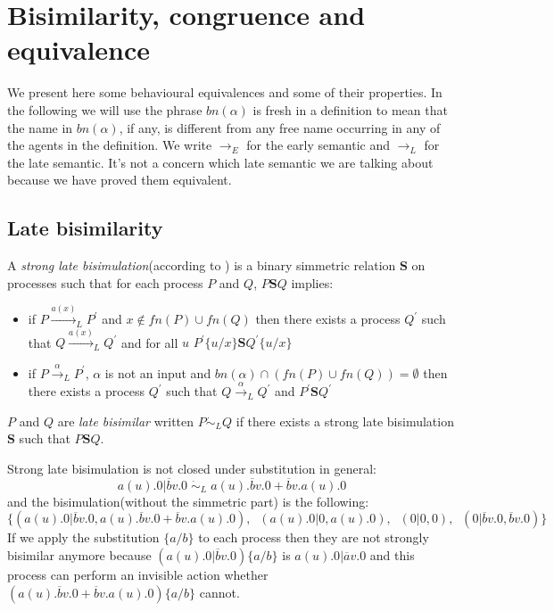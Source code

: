 \section{Bisimilarity, congruence and equivalence}

We present here some behavioural equivalences and some of their properties. In the following we will use the phrase $bn(\alpha)$ is fresh in a definition to mean that the name in $bn(\alpha)$, if any, is different from any free name occurring in any of the agents in the definition. We write $\rightarrow_{E}$ for the early semantic and $\rightarrow_{L}$ for the late semantic. It's not a concern which late semantic we are talking about because we have proved them equivalent.


\subsection{Late bisimilarity}

\begin{definition}
  A \emph{strong late bisimulation}(according to \cite{parrow}) is a binary simmetric relation $\mathbf{S}$ on processes such that for each process $P$ and $Q$, $P\mathbf{S}Q$ implies:
  \begin{itemize}
    \item
      if $P \xrightarrow{a(x)}_{L} P^{'}$ and $x\notin fn(P)\cup fn(Q)$ then there exists a process $Q^{'}$ such that $Q \xrightarrow{a(x)}_{L} Q^{'}$ and for all $u$ $P^{'}\{u/x\}\mathbf{S}Q^{'}\{u/x\}$
    \item 
      if $P \xrightarrow{\alpha}_{L} P^{'}$, $\alpha$ is not an input and $bn(\alpha) \cap (fn(P)\cup fn(Q)) = \emptyset$ then there exists a process $Q^{'}$ such that $Q \xrightarrow{\alpha}_{L} Q^{'}$ and $P^{'}\mathbf{S}Q^{'}$
  \end{itemize}
  $P$ and $Q$ are \emph{late bisimilar} written $P\dot{\sim}_{L}Q$ if there exists a strong late bisimulation $\mathbf{S}$ such that $P\mathbf{S}Q$.
\end{definition}

\begin{example}
  Strong late bisimulation is not closed under substitution in general:
  \[
    a(u).0|\overline{b}v.0\; \dot{\sim}_{L}\; a(u).\overline{b}v.0 + \overline{b}v.a(u).0
  \]
  and the bisimulation(without the simmetric part) is  the following:
  \[
    \{(a(u).0|\overline{b}v.0, a(u).\overline{b}v.0 + \overline{b}v.a(u).0),\;\; (a(u).0|0,a(u).0),\;\; (0|0,0),\;\; (0|\overline{b}v.0,\overline{b}v.0)\} 
  \]
  If we apply the substitution $\{a/b\}$ to each process then they are not strongly bisimilar anymore because $(a(u).0|\overline{b}v.0)\{a/b\}$ is $a(u).0|\overline{a}v.0$ and this process can perform an invisible action whether $(a(u).\overline{b}v.0 + \overline{b}v.a(u).0)\{a/b\}$ cannot.
\end{example}

